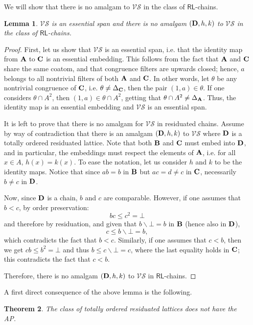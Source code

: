 \documentclass{amsart}
\newtheorem{theorem}{Theorem}[section]
\newtheorem{lemma}[theorem]{Lemma}
\theoremstyle{definition}
\numberwithin{equation}{section}
\newcommand{\alg}[1]{{\textbf{\upshape #1}}}  %
\newcommand{\VS}{\mathcal{VS}}
\begin{document}
 We will show that there is no amalgam to $\VS$ in the class of $\mathsf{RL}$-chains.

\begin{lemma}\label{lemma:noamalgam}
	$\VS$ is an essential span and there is no  amalgam $(\alg D, h,k)$ to $\VS$ in the class of $\mathsf{RL}$-chains.
\end{lemma}
\begin{proof}
First, let us show that $\VS$ is an essential span, i.e. that the identity map from $\alg A$ to $\alg C$ is an essential embedding. This follows from the fact that $\alg A$ and $\alg C$ share the same coatom, and that congruence filters are upwards closed; hence, $a$ belongs to all nontrivial filters of both $\alg A$ and $\alg C$. In other words, let $\theta$ be any nontrivial congruence of $\alg C$, i.e. $\theta \neq \Delta_{\alg C}$, then the pair $(1, a) \in \theta$. If one considers $\theta \cap A^2$, then $(1,a) \in \theta \cap A^2$, getting that $\theta \cap A^2 \neq \Delta_{\alg A}$. Thus, the identity map is an essential embedding and $\VS$ is an essential span. 


It is left to prove that there is no amalgam for $\VS$ in residuated chains. Assume by way of contradiction that there is an amalgam $(\alg D, h,k)$ to $\VS$ where $\alg D$ is a totally ordered residuated lattice. Note that both $\alg B$ and $\alg C$ must embed into $\alg D$, and in particular, the embeddings must respect the elements of $\alg A$, i.e. for all $x \in A$, $h(x) = k(x)$. To ease the notation, let us consider $h$ and $k$ to be the identity maps. Notice that since $ab=b$ in $\alg B$ but $ac=d \neq c$ in $\alg C$, necessarily $b \neq c$ in $\alg D$. 

Now, since $\alg D$ is a chain, $b$ and $c$ are comparable.
However, if one assumes that $b < c$, by order preservation: $$bc \leq c^2=\bot$$ and therefore by residuation, and given that $b \backslash \bot=b$ in $\alg B$ (hence also in $\alg D$), $$c \leq b \backslash \bot =b,$$ which contradicts the fact that $b < c$. 
Similarly, if one assumes that $c < b$, then we get $cb \leq b^2=\bot$ and thus $b \leq c \backslash \bot = c$, where the last equality holds in $\alg C$; this contradicts the fact that $c < b$.

Therefore, there is no amalgam $(\alg D, h,k)$ to $\VS$ in $\mathsf{RL}$-chains. 
\end{proof}
A first direct consequence of the above lemma is the following.
\begin{theorem}
	The class of totally ordered residuated lattices does not have the AP.
\end{theorem}
\end{document}
